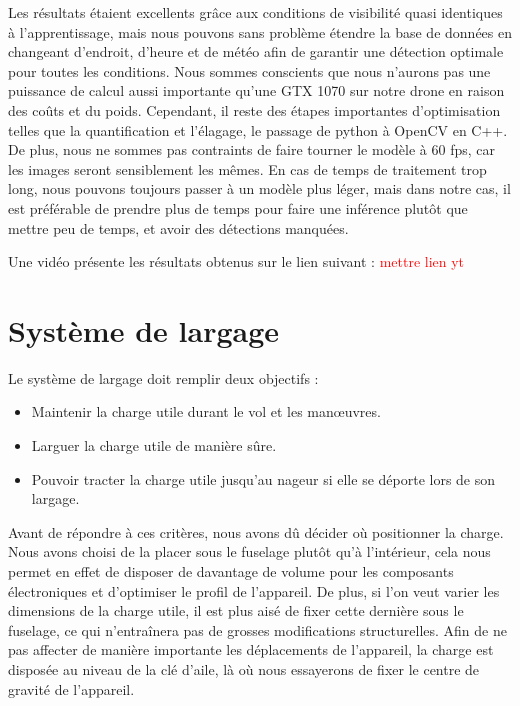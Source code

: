 \documentclass[a4paper,12pt,french]{report}
\begin{document}
Les résultats étaient excellents grâce aux conditions de visibilité quasi identiques à l'apprentissage, mais nous pouvons sans problème étendre la base de données en changeant d'endroit, d'heure et de météo afin de garantir une détection optimale pour toutes les conditions. Nous sommes conscients que nous n'aurons pas une puissance de calcul aussi importante qu'une GTX 1070 sur notre drone en raison des coûts et du poids. Cependant, il reste des étapes importantes d'optimisation telles que la quantification et l'élagage, le passage de python à OpenCV en C++. De plus, nous ne sommes pas contraints de faire tourner le modèle à 60 fps, car les images seront sensiblement les mêmes. En cas de temps de traitement trop long, nous pouvons toujours passer à un modèle plus léger, mais dans notre cas, il est préférable de prendre plus de temps pour faire une inférence plutôt que mettre peu de temps, et avoir des détections manquées.\newline

Une vidéo présente les résultats obtenus sur le lien suivant :
\textcolor{red}{mettre lien yt}

\section{Système de largage}
\label{larg}
Le système de largage doit remplir deux objectifs :

\begin{itemize}
    \item Maintenir la charge utile durant le vol et les manœuvres.
    \item Larguer la charge utile de manière sûre.
    \item Pouvoir tracter la charge utile jusqu’au nageur si elle se déporte lors de son largage.\newline
\end{itemize}

Avant de répondre à ces critères, nous avons dû décider où positionner la charge. Nous avons choisi de la placer sous le fuselage plutôt qu’à l’intérieur, cela nous permet en effet de disposer de davantage de volume pour les composants électroniques et d’optimiser le profil de l’appareil. De plus, si l’on veut varier les dimensions de la charge utile, il est plus aisé de fixer cette dernière sous le fuselage, ce qui n'entraînera pas de grosses modifications structurelles. Afin de ne pas affecter de manière importante les déplacements de l’appareil, la charge est disposée au niveau de la clé d’aile, là où nous essayerons de fixer le centre de gravité de l’appareil.\newline
\end{document}
